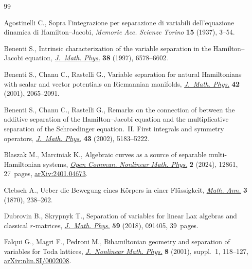 \documentclass[pdftex]{sigma}
\numberwithin{equation}{section}
\begin{document}

\begin{thebibliography}{99}
\footnotesize\itemsep=0pt

Agostinelli C., Sopra l'integrazione per separazione di variabili
 dell'equazione dinamica di {H}amilton--{J}acobi, \textit{Memorie Acc. Scienze
 Torino} \textbf{15} (1937), 3--54.

Benenti S., Intrinsic characterization of the variable separation in the
 {H}amilton--{J}acobi equation,
 \href{https://doi.org/10.1063/1.532226}{\textit{J.~Math. Phys.}} \textbf{38}
 (1997), 6578--6602.

Benenti S., Chanu C., Rastelli G., Variable separation for natural
 {H}amiltonians with scalar and vector potentials on {R}iemannian manifolds,
 \href{https://doi.org/10.1063/1.1340868}{\textit{J.~Math. Phys.}} \textbf{42}
 (2001), 2065--2091.

Benenti S., Chanu C., Rastelli G., Remarks on the connection of between the
 additive separation of the {H}amilton--{J}acobi equation and the
 multiplicative separation of the Schroedinger equation.~{II}. First integrals
 and symmetry operators,
 \href{https://doi.org/10.1063/1.1506181}{\textit{J.~Math. Phys.}} \textbf{43}
 (2002), 5183--5222.

Blaszak M., Marciniak K., Algebraic curves as a source of separable
 multi-{H}amiltonian systems,
 \href{https://doi.org/10.46298/ocnmp.12861}{\textit{Open Commun. Nonlinear
 Math. Phys.}} \textbf{2} (2024), 12861, 27~pages,
 \href{http://arxiv.org/abs/2401.04673}{arXiv:2401.04673}.

Clebsch A., Ueber die {B}ewegung eines {K}\"orpers in einer {F}l\"ussigkeit,
 \href{https://doi.org/10.1007/BF01443985}{\textit{Math. Ann.}} \textbf{3}
 (1870), 238--262.

Dubrovin B., Skrypnyk T., Separation of variables for linear {L}ax algebras and
 classical {$r$}-matrices,
 \href{https://doi.org/10.1063/1.5031769}{\textit{J.~Math. Phys.}} \textbf{59}
 (2018), 091405, 39~pages.

Falqui G., Magri F., Pedroni M., Bihamiltonian geometry and separation of
 variables for {T}oda lattices,
 \href{https://doi.org/10.2991/jnmp.2001.8.s.21}{\textit{J.~Nonlinear Math.
 Phys.}} \textbf{8} (2001), suppl.~1, 118--127,
 \href{http://arxiv.org/abs/nlin.SI/0002008}{arXiv:nlin.SI/0002008}.


\end{thebibliography}
\end{document}
